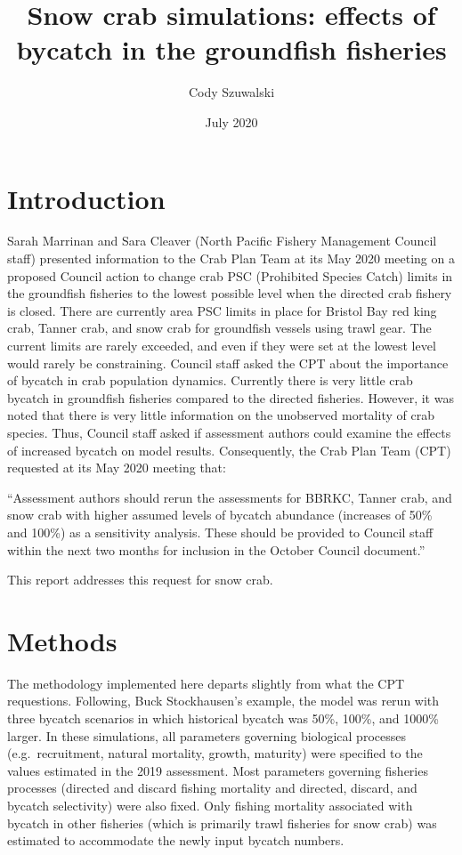 \documentclass[]{article}
\title{Snow crab simulations: effects of bycatch in the groundfish fisheries}
\author{Cody Szuwalski}
\date{July 2020}
\begin{document}
\maketitle

{
\setcounter{tocdepth}{3}
\tableofcontents
}
\newpage

\newpage

\section{Introduction}\label{introduction}

Sarah Marrinan and Sara Cleaver (North Pacific Fishery Management
Council staff) presented information to the Crab Plan Team at its May
2020 meeting on a proposed Council action to change crab PSC (Prohibited
Species Catch) limits in the groundfish fisheries to the lowest possible
level when the directed crab fishery is closed. There are currently area
PSC limits in place for Bristol Bay red king crab, Tanner crab, and snow
crab for groundfish vessels using trawl gear. The current limits are
rarely exceeded, and even if they were set at the lowest level would
rarely be constraining. Council staff asked the CPT about the importance
of bycatch in crab population dynamics. Currently there is very little
crab bycatch in groundfish fisheries compared to the directed fisheries.
However, it was noted that there is very little information on the
unobserved mortality of crab species. Thus, Council staff asked if
assessment authors could examine the effects of increased bycatch on
model results. Consequently, the Crab Plan Team (CPT) requested at its
May 2020 meeting that:

``Assessment authors should rerun the assessments for BBRKC, Tanner
crab, and snow crab with higher assumed levels of bycatch abundance
(increases of 50\% and 100\%) as a sensitivity analysis. These should be
provided to Council staff within the next two months for inclusion in
the October Council document.''

This report addresses this request for snow crab.

\section{Methods}\label{methods}

The methodology implemented here departs slightly from what the CPT
requestions. Following, Buck Stockhausen's example, the model was rerun
with three bycatch scenarios in which historical bycatch was 50\%,
100\%, and 1000\% larger. In these simulations, all parameters governing
biological processes (e.g.~recruitment, natural mortality, growth,
maturity) were specified to the values estimated in the 2019 assessment.
Most parameters governing fisheries processes (directed and discard
fishing mortality and directed, discard, and bycatch selectivity) were
also fixed. Only fishing mortality associated with bycatch in other
fisheries (which is primarily trawl fisheries for snow crab) was
estimated to accommodate the newly input bycatch numbers.
\end{document}
